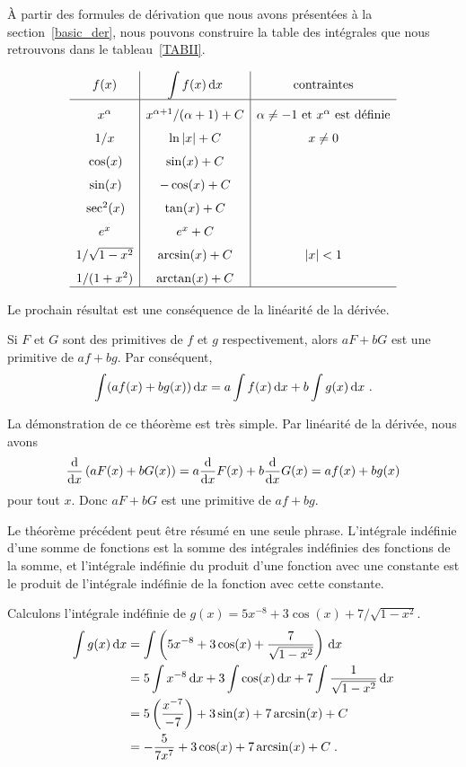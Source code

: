 {À partir des formules de dérivation que nous avons présentées à la
section~\ref{basic_der}, nous pouvons construire la table des intégrales
que nous retrouvons dans le tableau~\ref{TABII}.

\begin{table}
\[
\begin{array}{c|c|cl}
f(x) & \DS \int f(x)\dx{x} & \text{contraintes} \\
\hline
\rule{0em}{1.5em} x^\alpha & x^{\alpha+1}/(\alpha+1) + C &
\alpha \neq -1 \ \text{et}\ x^\alpha\ \text{est définie} \\ 
\rule{0em}{1.5em} 1/x & \ln|x| + C & x \neq 0 \\
\rule{0em}{1.5em} \cos(x) & \sin(x) + C & \\
\rule{0em}{1.5em} \sin(x) & -\cos(x) + C & \\
\rule{0em}{1.5em} \sec^2(x) & \tan(x) + C & \\
\rule{0em}{1.5em} e^x & e^x + C & \\
\rule{0em}{1.5em} 1/\sqrt{1-x^2} & \arcsin(x) + C & |x|<1 \\
\rule{0em}{1.5em} 1/(1+x^2) & \arctan(x) + C & \\
\hline
\end{array}
\]
\caption{Quelques intégrales indéfinies \label{TABII}}
\end{table}

Le prochain résultat est une conséquence de la linéarité de la
dérivée.

\begin{theorem}
Si $F$ et $G$ sont des primitives de $f$ et $g$ respectivement, alors
$a F + b G$ est une primitive de $a f + b g$.  Par conséquent,
\[
\int (a f(x) + b g(x)) \dx{x} = a \int f(x) \dx{x}
+ b \int g(x) \dx{x} \ .
\]
\end{theorem}

La démonstration de ce théorème est très simple.  Par linéarité de la
dérivée, nous avons
\[
\dfdx{\left(a F(x) + b G(x)\right)}{x}
= a \dfdx{F(x)}{x} + b \dfdx{G(x)}{x}
= a f(x) + b g(x)
\]
pour tout $x$.  Donc $aF+bG$ est une primitive de $af + bg$.  

Le théorème précédent peut être résumé en une seule phrase.
L'intégrale indéfinie d'une somme de fonctions est la somme des
intégrales indéfinies des fonctions de la somme, et l'intégrale
indéfinie du produit d'une fonction avec une constante est le produit
de l'intégrale indéfinie de la fonction avec cette constante. 

\begin{egg}
Calculons l'intégrale indéfinie de
$g(x) = 5 x^{-8} + 3 \cos(x) + 7/\sqrt{1-x^2}$.
\begin{align*}
\int g(x)\dx{x} &=
\int \left(5 x^{-8} + 3 \cos(x) + \frac{7}{\sqrt{1-x^2}} \right)\dx{x} \\
&= 5 \int x^{-8} \dx{x} + 3 \int \cos(x)\dx{x}
+ 7 \int \frac{1}{\sqrt{1-x^2}}\dx{x}  \\
&= 5 \left( \frac{x^{-7}}{-7}\right) + 3 \sin(x) + 7 \arcsin(x) + C\\
&= -\frac{5}{7x^7} + 3\cos(x) + 7 \arcsin(x) + C \; .
\end{align*}
\end{egg}

}
